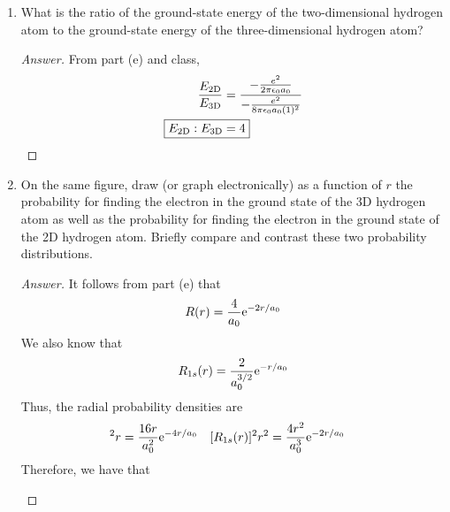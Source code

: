 \documentclass[../psets.tex]{subfiles}
\begin{document}
\begin{enumerate}
\begin{enumerate}
\begin{proof}[Answer]
\begin{align*}
                &= C^2\int_0^{2\pi}\dd{\phi}\left[ -\frac{ra_0}{4}\e[-4r/a_0]-\frac{a_0^2}{16}\e[-4r/a_0] \right]_0^\infty\\
                &= \frac{C^2a_0^2}{16}\cdot 2\pi\\
                C &= \sqrt{\frac{2}{\pi}}\frac{2}{a_0}
            \end{align*}
            It follows that
            \begin{equation*}
                \boxed{\psi(r,\phi) = \sqrt{\frac{2}{\pi}}\frac{2}{a_0}\e[-2r/a_0]}
            \end{equation*}
        \end{proof}
        \item What is the ratio of the ground-state energy of the two-dimensional hydrogen atom to the ground-state energy of the three-dimensional hydrogen atom?
        \begin{proof}[Answer]
            From part (e) and class,
            \begin{align*}
                \frac{E_\text{2D}}{E_\text{3D}} &= \frac{-\frac{e^2}{2\pi\epsilon_0a_0}}{-\frac{e^2}{8\pi\epsilon_0a_0(1)^2}}\\
                \Aboxed{E_\text{2D}:E_\text{3D} &= 4}
            \end{align*}
        \end{proof}
        \item On the same figure, draw (or graph electronically) as a function of $r$ the probability for finding the electron in the ground state of the 3D hydrogen atom as well as the probability for finding the electron in the ground state of the 2D hydrogen atom. Briefly compare and contrast these two probability distributions.
        \begin{proof}[Answer]
            It follows from part (e) that
            \begin{equation*}
                R(r) = \frac{4}{a_0}\e[-2r/a_0]
            \end{equation*}
            We also know that
            \begin{equation*}
                R_{1s}(r) = \frac{2}{a_0^{3/2}}\e[-r/a_0]
            \end{equation*}
            Thus, the radial probability densities are
            \begin{align*}
                [R(r)]^2r &= \frac{16r}{a_0^2}\e[-4r/a_0]&
                [R_{1s}(r)]^2r^2 &= \frac{4r^2}{a_0^3}\e[-2r/a_0]
            \end{align*}
            Therefore, we have that
            \begin{center}
\end{center}
\end{proof}
\end{enumerate}
\end{enumerate}
\end{document}
